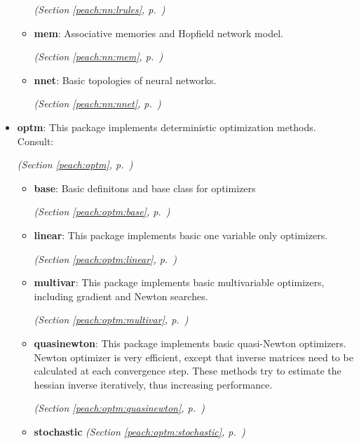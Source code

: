 \begin{itemize}
\begin{itemize}
  \textit{(Section \ref{peach:nn:lrules}, p.~\pageref{peach:nn:lrules})}

    \item \textbf{mem}: 
Associative memories and Hopfield network model.


  \textit{(Section \ref{peach:nn:mem}, p.~\pageref{peach:nn:mem})}

    \item \textbf{nnet}: 
Basic topologies of neural networks.


  \textit{(Section \ref{peach:nn:nnet}, p.~\pageref{peach:nn:nnet})}

  \end{itemize}
\item \textbf{optm}: 
This package implements deterministic optimization methods. Consult:


  \textit{(Section \ref{peach:optm}, p.~\pageref{peach:optm})}

  \begin{itemize}
\setlength{\parskip}{0ex}
    \item \textbf{base}: 
Basic definitons and base class for optimizers


  \textit{(Section \ref{peach:optm:base}, p.~\pageref{peach:optm:base})}

    \item \textbf{linear}: 
This package implements basic one variable only optimizers.


  \textit{(Section \ref{peach:optm:linear}, p.~\pageref{peach:optm:linear})}

    \item \textbf{multivar}: 
This package implements basic multivariable optimizers, including gradient and
Newton searches.


  \textit{(Section \ref{peach:optm:multivar}, p.~\pageref{peach:optm:multivar})}

    \item \textbf{quasinewton}: 
This package implements basic quasi-Newton optimizers. Newton optimizer is very
efficient, except that inverse matrices need to be calculated at each
convergence step. These methods try to estimate the hessian inverse iteratively,
thus increasing performance.


  \textit{(Section \ref{peach:optm:quasinewton}, p.~\pageref{peach:optm:quasinewton})}

    \item \textbf{stochastic}
  \textit{(Section \ref{peach:optm:stochastic}, p.~\pageref{peach:optm:stochastic})}


\end{itemize}
\end{itemize}
